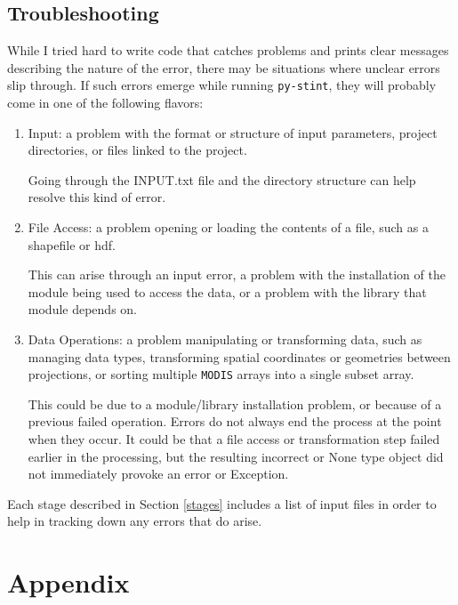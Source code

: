 \documentclass[twoside,a4paper]{refart}
\begin{document}
\subsection{Troubleshooting}
While I tried hard to write code that catches problems and prints clear messages describing the nature of the error, there may be situations where unclear errors slip through.  If such errors emerge while running \texttt{py-stint}, they will probably come in one of the following flavors:
\begin{enumerate}
  \item
    Input: a problem with the format or structure of input parameters, 
    project directories, or files linked to the project.  
    
    Going through the INPUT.txt file and the directory structure 
    can help resolve this kind of error.
  \item
    File Access: a problem opening or loading the contents of a file, 
    such as a shapefile or hdf.  
    
    This can arise through an input error, a problem with the 
    installation of the module being used to access the data,
    or a problem with the library that module depends on.
  \item
    Data Operations: a problem manipulating or transforming data, 
    such as managing data types, transforming spatial coordinates or 
    geometries between projections, or sorting multiple 
    \texttt{MODIS} arrays into a single subset array.
    
    This could be due to a module/library installation problem, or 
    because of a previous failed operation. Errors do not always end the process 
    at the point when they occur. It could be that a file access or 
    transformation step failed earlier in the processing, but the 
    resulting incorrect or None type object did not immediately provoke an 
    error or Exception.
    
\end{enumerate}

Each stage described in Section \ref{stages} includes a list of input files in order to help in tracking down any errors that do arise.
\clearpage
\section*{Appendix}
\appendix
\end{document}
